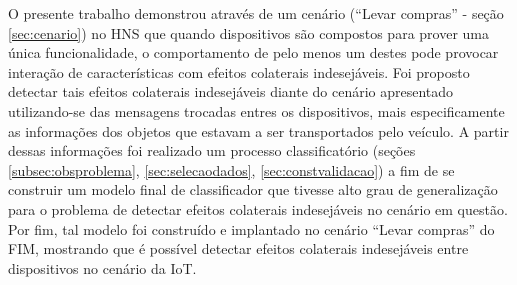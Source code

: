 O presente trabalho demonstrou através de um cenário (``Levar compras'' - seção \ref{sec:cenario}) no HNS que quando dispositivos são compostos para prover uma única funcionalidade, o comportamento de pelo menos um destes pode provocar interação de características com efeitos colaterais indesejáveis. Foi proposto detectar tais efeitos colaterais indesejáveis diante do cenário apresentado utilizando-se das mensagens trocadas entres os dispositivos, mais especificamente as informações dos objetos que estavam a ser transportados pelo veículo. A partir dessas informações foi realizado um processo classificatório (seções \ref{subsec:obsproblema}, \ref{sec:selecaodados}, \ref{sec:constvalidacao}) a fim de se construir um modelo final de classificador que tivesse alto grau de generalização para o problema de detectar efeitos colaterais indesejáveis no cenário em questão. Por fim, tal modelo foi construído e implantado no cenário ``Levar compras'' do FIM, mostrando que é possível detectar efeitos colaterais indesejáveis entre dispositivos no cenário da IoT.

